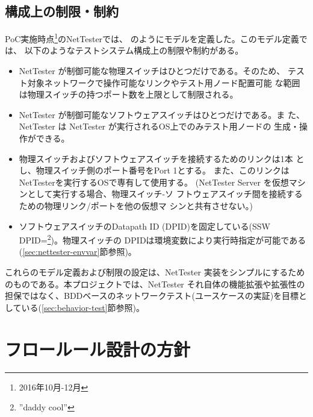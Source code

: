   \subsection{構成上の制限・制約}
  \label{sec:nettester-model-restriction}

PoC実施時点\footnote{2016年10月-12月}のNetTesterでは、
のようにモデルを定義した。このモデル定義では、
以下のようなテストシステム構成上の制限や制約がある。
\begin{itemize}
 \item NetTester が制御可能な物理スイッチはひとつだけである。そのため、
       テスト対象ネットワークで操作可能なリンクやテスト用ノード配置可能
       な範囲は物理スイッチの持つポート数を上限として制限される。
 \item NetTester が制御可能なソフトウェアスイッチはひとつだけである。ま
       た、NetTester は NetTester が実行されるOS上でのみテスト用ノードの
       生成・操作ができる。
 \item 物理スイッチおよびソフトウェアスイッチを接続するためのリンクは1本
       とし、物理スイッチ側のポート番号をPort 1とする。
       また、このリンクはNetTesterを実行するOSで専有して使用する。
       (NetTester Server を仮想マシンとして実行する場合、物理スイッチ-ソ
       フトウェアスイッチ間を接続するための物理リンク/ポートを他の仮想マ
       シンと共有させない。)
 \item ソフトウェアスイッチのDatapath ID (DPID)を固定している(SSW
       DPID=\footnote{''daddy cool''})。物理スイッチの
       DPIDは環境変数により実行時指定が可能である
       (\ref{sec:nettester-envvar}節参照)。
\end{itemize}
これらのモデル定義および制限の設定は、NetTester 実装をシンプルにするため
のものである。本プロジェクトでは、NetTester それ自体の機能拡張や拡張性の
担保ではなく、BDDベースのネットワークテスト(ユースケースの実証)を目標と
している(\ref{sec:behavior-test}節参照)。

 \section{フロールール設計の方針}
 \label{sec:flow-design-policy}

